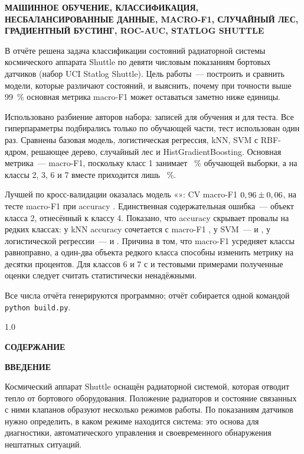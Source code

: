 \documentclass[14pt,a4paper]{extarticle}
\makeatletter
\renewcommand\tableofcontents{%
  \clearpage
  \begin{spacing}{1.0}%
  \begin{center}\bfseries СОДЕРЖАНИЕ\end{center}%
  \@starttoc{toc}%
  \end{spacing}%
}
\newcommand{\struct}[1]{%
  \clearpage
  \begin{center}\bfseries #1\end{center}%
  \addcontentsline{toc}{section}{#1}%
}
\makeatother
\begin{document}
\vspace{4mm}
\noindent\textbf{МАШИННОЕ ОБУЧЕНИЕ, КЛАССИФИКАЦИЯ, НЕСБАЛАНСИРОВАННЫЕ
ДАННЫЕ, MACRO-F1, СЛУЧАЙНЫЙ ЛЕС, ГРАДИЕНТНЫЙ БУСТИНГ, ROC-AUC,
STATLOG SHUTTLE}

\vspace{4mm}
\noindent
В отчёте решена задача классификации состояний радиаторной системы
космического аппарата Shuttle по девяти числовым показаниям бортовых
датчиков (набор UCI Statlog Shuttle). Цель работы~--- построить и сравнить
модели, которые различают \NClasses{} состояний, и выяснить, почему при
точности выше 99~\% основная метрика macro-F1 может оставаться заметно ниже
единицы.

Использовано разбиение авторов набора: \NTrain{} записей для обучения
и \NTest{} для теста. Все гиперпараметры подбирались только по обучающей
части, тест использован один раз. Сравнены базовая модель, логистическая
регрессия, kNN, SVM с RBF-ядром, решающее дерево, случайный лес
и HistGradientBoosting. Основная метрика~--- macro-F1, поскольку класс 1
занимает \ShareMajorTrain~\% обучающей выборки, а на классы 2, 3, 6 и 7
вместе приходится лишь \ShareMinorTrain~\%.

Лучшей по кросс-валидации оказалась модель «\BestName»:
CV macro-F1 $0,96 \pm 0,06$, на тесте macro-F1 \BestFOne{}
при accuracy \BestAcc. Единственная содержательная ошибка~--- объект
класса 2, отнесённый к классу 4. Показано, что accuracy скрывает провалы
на редких классах: у kNN accuracy \AccKnn{} сочетается с macro-F1
\FOneKnn, у SVM~--- \AccSvm{} и \FOneSvm, у логистической регрессии~---
\AccLogreg{} и \FOneLogreg. Причина в том, что macro-F1 усредняет классы
равноправно, а один-два объекта редкого класса способны изменить метрику
на десятки процентов. Для классов 6 и 7 с \SupportClassSix{} и
\SupportClassSeven{} тестовыми примерами полученные оценки следует считать
статистически ненадёжными.

Все числа отчёта генерируются программно; отчёт собирается одной командой
\texttt{python build.py}.

\tableofcontents

\struct{ВВЕДЕНИЕ}

Космический аппарат Shuttle оснащён радиаторной системой, которая отводит
тепло от бортового оборудования. Положение радиаторов и состояние связанных
с ними клапанов образуют несколько режимов работы. По показаниям датчиков
нужно определить, в каком режиме находится система: это основа для
диагностики, автоматического управления и своевременного обнаружения
нештатных ситуаций.
\end{document}

